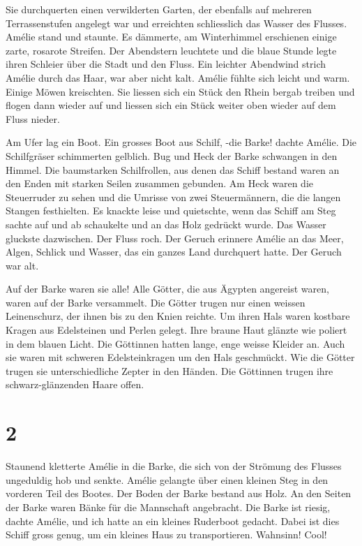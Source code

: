 \documentclass[11pt,titlepage,a5paper]{book}
\begin{document}
Sie durchquerten einen verwilderten Garten, der ebenfalls auf mehreren Terrassenstufen angelegt war und erreichten schliesslich das Wasser des Flusses. Amélie stand und staunte. Es dämmerte, am Winterhimmel erschienen einige zarte, rosarote Streifen. Der Abendstern leuchtete und die blaue Stunde legte ihren Schleier über die Stadt und den Fluss. Ein leichter Abendwind strich Amélie durch das Haar, war aber nicht kalt. Amélie fühlte sich leicht und warm. Einige Möwen kreischten. Sie liessen sich ein Stück den Rhein bergab treiben und flogen dann wieder auf und liessen sich ein Stück weiter oben wieder auf dem Fluss nieder. 

Am Ufer lag ein Boot. Ein grosses Boot aus Schilf, -die Barke! dachte Amélie. Die Schilfgräser schimmerten gelblich. Bug und Heck der Barke schwangen in den Himmel. Die baumstarken Schilfrollen, aus denen das Schiff bestand waren an den Enden mit starken Seilen zusammen gebunden. Am Heck waren die Steuerruder zu sehen und die Umrisse von zwei Steuermännern, die die langen Stangen festhielten. Es knackte leise und quietschte, wenn das Schiff am Steg sachte auf und ab schaukelte und an das Holz gedrückt wurde. Das Wasser gluckste dazwischen. Der Fluss roch. Der Geruch erinnere Amélie an das Meer, Algen, Schlick und Wasser, das ein ganzes Land durchquert hatte. Der Geruch war alt.

Auf der Barke waren sie alle! Alle Götter, die aus Ägypten angereist waren, waren auf der Barke versammelt. Die Götter trugen nur einen weissen Leinenschurz, der ihnen bis zu den Knien reichte. Um ihren Hals waren kostbare Kragen aus Edelsteinen und Perlen gelegt. Ihre braune Haut glänzte wie poliert in dem blauen Licht. Die Göttinnen hatten lange, enge weisse Kleider an. Auch sie waren mit schweren Edelsteinkragen um den Hals geschmückt. Wie die Götter trugen sie unterschiedliche Zepter in den Händen. Die Göttinnen trugen ihre schwarz-glänzenden Haare offen. 

\section*{2}

Staunend kletterte Amélie in die Barke, die sich von der Strömung des Flusses ungeduldig hob und senkte. Amélie gelangte über einen kleinen Steg in den  vorderen Teil des Bootes. Der Boden der Barke bestand aus Holz. An den Seiten der Barke waren Bänke für die Mannschaft angebracht. Die Barke ist riesig, dachte Amélie, und ich hatte an ein kleines Ruderboot gedacht. Dabei ist dies Schiff gross genug, um ein kleines Haus zu transportieren. Wahnsinn! Cool!
\end{document}
